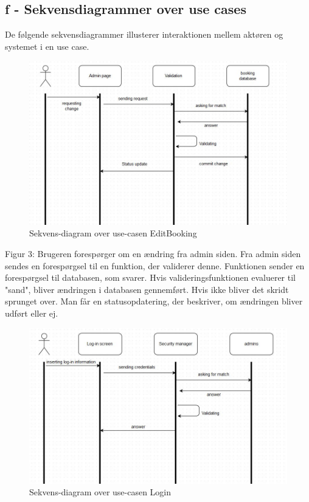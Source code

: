 \documentclass[12pt,a4paper]{article}
\begin{document}
\subsection{f - Sekvensdiagrammer over use cases}
De følgende sekvensdiagrammer illusterer interaktionen mellem aktøren og systemet i en use case.\\ 
\begin{figure}[H]
\centering
\includegraphics[scale=0.6]{adminInteraction.jpg}
\caption{Sekvens-diagram over use-casen EditBooking}
\end{figure}
Figur 3: Brugeren forespørger om en ændring fra admin siden. 
Fra admin siden sendes en forespørgsel til en funktion, der validerer denne. 
Funktionen sender en forespørgsel til databasen, som svarer.
Hvis valideringsfunktionen evaluerer til "sand", 
bliver ændringen i databasen gennemført.
Hvis ikke bliver det skridt sprunget over.
Man får en statusopdatering, der beskriver, om ændringen bliver udført eller ej.
\begin{figure}[H]
\centering
\includegraphics[scale=0.6]{adminLog-in.jpg}
\caption{Sekvens-diagram over use-casen Login}
\end{figure}
\end{document}
